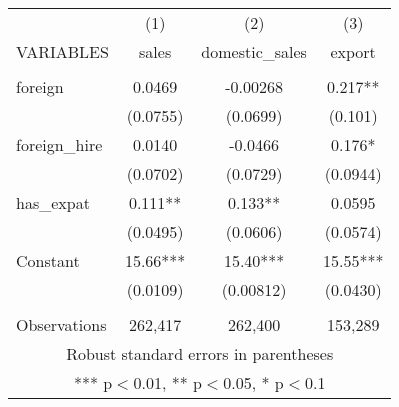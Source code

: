 \documentclass[]{article}
\begin{document}
\begin{tabular}{lccc} \hline
 & (1) & (2) & (3) \\
VARIABLES & sales & domestic\_sales & export \\ \hline
 &  &  &  \\
foreign & 0.0469 & -0.00268 & 0.217** \\
 & (0.0755) & (0.0699) & (0.101) \\
foreign\_hire & 0.0140 & -0.0466 & 0.176* \\
 & (0.0702) & (0.0729) & (0.0944) \\
has\_expat & 0.111** & 0.133** & 0.0595 \\
 & (0.0495) & (0.0606) & (0.0574) \\
Constant & 15.66*** & 15.40*** & 15.55*** \\
 & (0.0109) & (0.00812) & (0.0430) \\
 &  &  &  \\
 Observations & 262,417 & 262,400 & 153,289 \\ \hline
\multicolumn{4}{c}{ Robust standard errors in parentheses} \\
\multicolumn{4}{c}{ *** p$<$0.01, ** p$<$0.05, * p$<$0.1} \\
\end{tabular}
\end{document}
